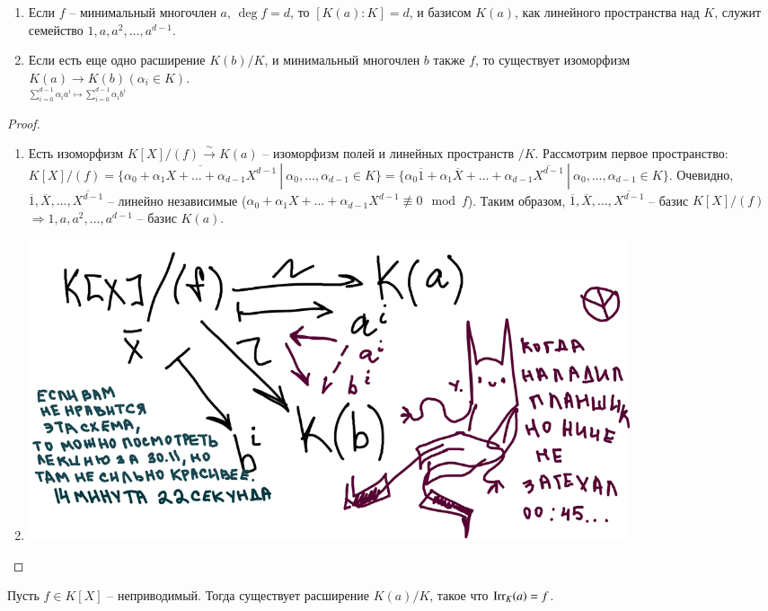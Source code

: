 \documentclass[main]{subfiles}
\begin{document}

\begin{corollary}
    \begin{enumerate}
        \item Если $f$ -- минимальный многочлен $a$, $\deg f = d$, то $[K(a):K] = d$, и базисом $K(a)$, как линейного пространства над $K$, служит
    семейство $1, a, a^2, \ldots, a^{d-1}$.
        \item Если есть еще одно расширение $K(b)/K$, и минимальный многочлен $b$ также $f$, то существует изоморфизм
        $\underset{\sum_{i=0}^{d-1}\alpha_ia^i \mapsto \sum_{i=0}^{d-1}\alpha_ib^i}{K(a) \rightarrow K(b)} (\alpha_i \in K)$.
    \end{enumerate}
\end{corollary}

\begin{proof}
    \begin{enumerate}
    \item Есть изоморфизм $K[X]/(f) \xrightarrow{\sim } K(a)$ -- изоморфизм полей и линейных пространств $/K$. Рассмотрим первое пространство: 
    $K[X]/(f) = \{\overline{\alpha_0 + \alpha_1X + \ldots + \alpha_{d-1}X^{d-1}} \ | \ \alpha_0, \ldots, \alpha_{d-1} \in K\} = 
    \{\alpha_0\overline{1} + \alpha_1\overline{X} + \ldots + \alpha_{d-1}\overline{X^{d-1}} \ | \ \alpha_0, \ldots, \alpha_{d-1} \in K\}$.
    Очевидно, $\overline{1}, \overline{X}, \ldots, \overline{X^{d-1}}$ -- линейно независимые
    ($\alpha_0 + \alpha_1X + \ldots + \alpha_{d-1}X^{d-1} \not\equiv 0 \mod f$). Таким образом, 
    $\overline{1}, \overline{X}, \ldots, \overline{X^{d-1}}$ -- базис $K[X]/(f)$ 
    $\Rightarrow 1, a, a^2, \ldots, a^{d-1}$ -- базис $K(a)$.
    \item \includegraphics[width=0.8\textwidth]{ugly_scheme.jpg}
    \end{enumerate}
\end{proof}

\begin{proposition}
    Пусть $f \in K[X]$ -- неприводимый. Тогда существует расширение $K(a)/K$, такое что $\operatorname{Irr}_K(a) = f$.
\end{proposition}
\end{document}
